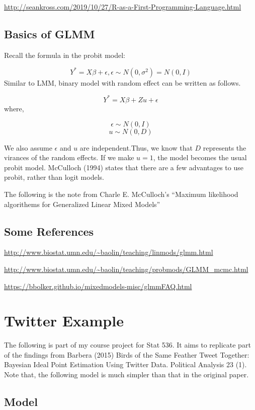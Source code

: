 \documentclass[]{book}
\begin{document}
\url{http://seankross.com/2019/10/27/R-as-a-First-Programming-Language.html}

\section{Basics of GLMM}\label{basics-of-glmm}

Recall the formula in the probit model:

\[Y^*=X\beta+\epsilon, \epsilon \sim N(0,\sigma^2)=N(0,I)\] Similar to
LMM, binary model with random effect can be written as follows.

\[Y^*=X\beta+ Z u+\epsilon\] where,

\[\epsilon \sim N(0,I)\] \[u \sim N(0, D)\]

We also assume \(\epsilon\) and \(u\) are independent.Thus, we know that
\(D\) represents the virances of the random effects. If we make
\(u =1\), the model becomes the usual probit model. McCulloch (1994)
states that there are a few advantages to use probit, rather than logit
models.

The following is the note from Charle E. McCulloch's ``Maximum
likelihood algorithems for Generalized Linear Mixed Models''

\section{Some References}\label{some-references}

\url{http://www.biostat.umn.edu/~baolin/teaching/linmods/glmm.html}

\url{http://www.biostat.umn.edu/~baolin/teaching/probmods/GLMM_mcmc.html}

\url{https://bbolker.github.io/mixedmodels-misc/glmmFAQ.html}

\chapter{Twitter Example}\label{twitter-example}

The following is part of my course project for Stat 536. It aims to
replicate part of the findings from Barbera (2015) Birds of the Same
Feather Tweet Together: Bayesian Ideal Point Estimation Using Twitter
Data. Political Analysis 23 (1). Note that, the following model is much
simpler than that in the original paper.

\section{Model}\label{model}
\end{document}
